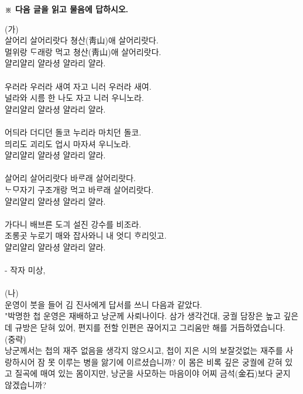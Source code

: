 \documentclass[10pt,a4paper]{article}
\begin{document}
\vspace{4mm}
{\small\textbf{※ 다음 글을 읽고 물음에 답하시오.}}
\vspace{2mm}
\begin{tcolorbox}[passage]
(가) \\{}
살어리 살어리랏다 쳥산(靑山)애 살어리랏다. \\{}
멀위랑 ᄃᆞ래랑 먹고 쳥산(靑山)애 살어리랏다. \\{}
얄리얄리 얄라셩 얄라리 얄라. \\{}
\vspace{4pt} \\{}
우러라 우러라 새여 자고 니러 우러라 새여. \\{}
널라와 시름 한 나도 자고 니러 우니노라. \\{}
얄리얄리 얄라셩 얄라리 얄라. \\{}
\vspace{4pt} \\{}
어듸라 더디던 돌코 누리라 마치던 돌코. \\{}
믜리도 괴리도 업시 마자셔 우니노라. \\{}
얄리얄리 얄라셩 얄라리 얄라. \\{}
\vspace{4pt} \\{}
살어리 살어리랏다 바ᄅᆞ래 살어리랏다. \\{}
ᄂᆞᄆᆞ자기 구조개랑 먹고 바ᄅᆞ래 살어리랏다. \\{}
얄리얄리 얄라셩 얄라리 얄라. \\{}
\vspace{4pt} \\{}
가다니 배브른 도긔 설진 강수를 비조라. \\{}
조롱곳 누로기 매와 잡사와니 내 엇디 ᄒᆞ리잇고. \\{}
얄리얄리 얄라셩 얄라리 얄라. \\{}
\vspace{4pt} \\{}
- 작자 미상,  \\{}
\vspace{4pt} \\{}
(나) \\{}
운영이 붓을 들어 김 진사에게 답서를 쓰니 다음과 같았다. \\{}
"박명한 첩 운영은 재배하고 낭군께 사뢰나이다. 삼가 생각건대, 궁궐 담장은 높고 깊은데 규방은 닫혀 있어, 편지를 전할 인편은 끊어지고 그리움만 해를 거듭하였습니다.  \\{}
(중략) \\{}
낭군께서는 첩의 재주 없음을 생각지 않으시고, 첩이 지은 시의 보잘것없는 재주를 사랑하시어 잠 못 이루는 병을 앓기에 이르셨습니까? 이 몸은 비록 깊은 궁궐에 갇혀 있고 질곡에 매여 있는 몸이지만, 낭군을 사모하는 마음이야 어찌 금석(金石)보다 굳지 않겠습니까? \\{}

\end{tcolorbox}
\end{document}
